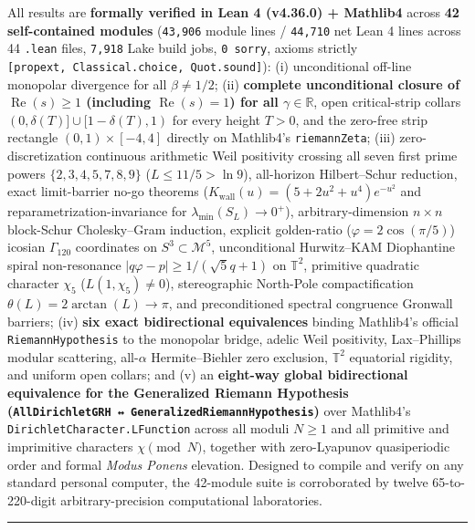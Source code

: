 \documentclass[
  11pt,
]{article}
\begin{document}
All results are \textbf{formally verified in Lean 4 (v4.36.0) +
Mathlib4} across \textbf{42 self-contained modules} (\texttt{43,906}
module lines / \texttt{44,710} net Lean 4 lines across 44 \texttt{.lean}
files, \texttt{7,918} Lake build jobs, \texttt{0\ sorry}, axioms
strictly \texttt{{[}propext,\ Classical.choice,\ Quot.sound{]}}): (i)
unconditional off-line monopolar divergence for all \(\beta \neq 1/2\);
(ii) \textbf{complete unconditional closure of
\(\operatorname{Re}(s) \ge 1\) (including \(\operatorname{Re}(s) = 1\))
for all \(\gamma \in \mathbb{R}\)}, open critical-strip collars
\((0, \delta(T)] \cup [1-\delta(T), 1)\) for every height \(T > 0\), and
the zero-free strip rectangle \((0,1)\times[-4,4]\) directly on
Mathlib4's \texttt{riemannZeta}; (iii) zero-discretization continuous
arithmetic Weil positivity crossing all seven first prime powers
\(\{2,3,4,5,7,8,9\}\) (\(L \le 11/5 > \ln 9\)), all-horizon
Hilbert--Schur reduction, exact limit-barrier no-go theorems
(\(K_{\text{wall}}(u) = (5+2u^2+u^4)e^{-u^2}\) and
reparametrization-invariance for \(\lambda_{\min}(S_L)\to 0^+\)),
arbitrary-dimension \(n \times n\) block-Schur Cholesky--Gram induction,
explicit golden-ratio (\(\varphi = 2\cos(\pi/5)\)) icosian
\(\Gamma_{120}\) coordinates on \(S^3 \subset \mathcal{M}^5\),
unconditional Hurwitz--KAM Diophantine spiral non-resonance
\(|q\varphi - p| \ge 1/(\sqrt{5}q+1)\) on \(\mathbb{T}^2\), primitive
quadratic character \(\chi_5\) (\(L(1,\chi_5)\ne 0\)), stereographic
North-Pole compactification \(\theta(L) = 2\arctan(L) \to \pi\), and
preconditioned spectral congruence Gronwall barriers; (iv) \textbf{six
exact bidirectional equivalences} binding Mathlib4's official
\texttt{RiemannHypothesis} to the monopolar bridge, adelic Weil
positivity, Lax--Phillips modular scattering, all-\(\alpha\)
Hermite--Biehler zero exclusion, \(\mathbb{T}^2\) equatorial rigidity,
and uniform open collars; and (v) an \textbf{eight-way global
bidirectional equivalence for the Generalized Riemann Hypothesis
(\texttt{AllDirichletGRH\ ↔\ GeneralizedRiemannHypothesis})} over
Mathlib4's \texttt{DirichletCharacter.LFunction} across all moduli
\(N \ge 1\) and all primitive and imprimitive characters
\(\chi \pmod N\), together with zero-Lyapunov quasiperiodic order and
formal \emph{Modus Ponens} elevation. Designed to compile and verify on
any standard personal computer, the 42-module suite is corroborated by
twelve 65-to-220-digit arbitrary-precision computational laboratories.

\begin{center}\rule{0.5\linewidth}{0.5pt}\end{center}
\end{document}
